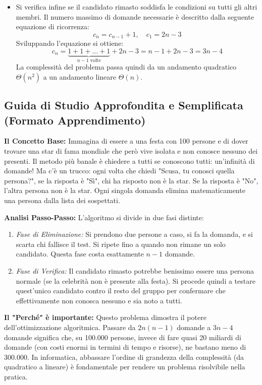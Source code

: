 \documentclass[a4paper, 11pt]{report}
\begin{document}
\begin{itemize}
\begin{itemize}
\item Si verifica infine se il candidato rimasto soddisfa le condizioni su tutti gli altri membri. Il numero massimo di domande necessarie è descritto dalla seguente equazione di ricorrenza:
\[ c_n = c_{n-1} + 1, \quad c_1 = 2n - 3 \]
Sviluppando l'equazione si ottiene:
\begin{equation*}
c_n = \underbrace{1 + 1 + \dots + 1}_{n-1 \text{ volte}} + 2n - 3 = n - 1 + 2n - 3 = 3n - 4
\end{equation*}
La complessità del problema passa quindi da un andamento quadratico $\Theta(n^2)$ a un andamento lineare $\Theta(n)$.
\end{itemize}
\end{itemize}

\vspace{0.5cm}
\subsection*{Guida di Studio Approfondita e Semplificata (Formato Apprendimento)}

\textbf{Il Concetto Base:}
Immagina di essere a una festa con 100 persone e di dover trovare una star di fama mondiale che però vive isolata e non conosce nessuno dei presenti. Il metodo più banale è chiedere a tutti se conoscono tutti: un'infinità di domande! Ma c'è un trucco: ogni volta che chiedi "Scusa, tu conosci quella persona?", se la risposta è "Sì", chi ha risposto non è la star. Se la risposta è "No", l'altra persona non è la star. Ogni singola domanda elimina matematicamente una persona dalla lista dei sospettati.

\textbf{Analisi Passo-Passo:}
L'algoritmo si divide in due fasi distinte:
\begin{enumerate}
\item \textit{Fase di Eliminazione:} Si prendono due persone a caso, si fa la domanda, e si scarta chi fallisce il test. Si ripete fino a quando non rimane un solo candidato. Questa fase costa esattamente $n-1$ domande.
\item \textit{Fase di Verifica:} Il candidato rimasto potrebbe benissimo essere una persona normale (se la celebrità non è presente alla festa). Si procede quindi a testare quest'unico candidato contro il resto del gruppo per confermare che effettivamente non conosca nessuno e sia noto a tutti.
\end{enumerate}

\textbf{Il "Perché" è importante:}
Questo problema dimostra il potere dell'ottimizzazione algoritmica. Passare da $2n(n-1)$ domande a $3n-4$ domande significa che, su 100.000 persone, invece di fare quasi 20 miliardi di domande (con costi enormi in termini di tempo e risorse), ne bastano meno di 300.000. In informatica, abbassare l'ordine di grandezza della complessità (da quadratico a lineare) è fondamentale per rendere un problema risolvibile nella pratica.
\end{document}
